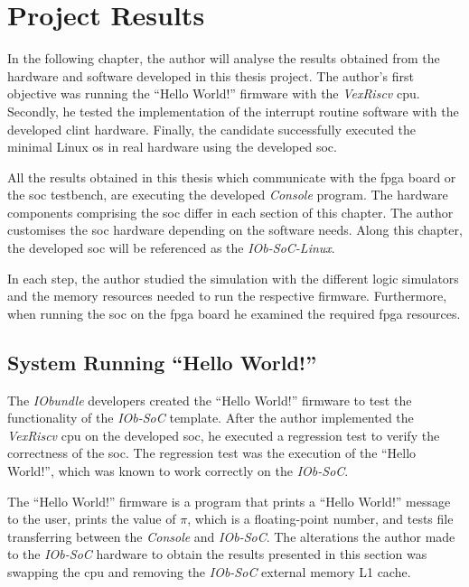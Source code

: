 \chapter{Project Results}
\label{chapter:project_results}
In the following chapter, the author will analyse the results obtained from the hardware and software developed in this thesis project. The author's first objective was running the \enquote{Hello World!} firmware with the \textit{VexRiscv} \acrshort{cpu}. Secondly, he tested the implementation of the interrupt routine software with the developed \acrshort{clint} hardware. Finally, the candidate successfully executed the minimal Linux \acrshort{os} in real hardware using the developed \acrlong{soc}.

All the results obtained in this thesis which communicate with the \acrshort{fpga} board or the \acrshort{soc} testbench, are executing the developed \textit{Console} program. The hardware components comprising the \acrshort{soc} differ in each section of this chapter. The author customises the \acrshort{soc} hardware depending on the software needs. Along this chapter, the developed \acrshort{soc} will be referenced as the \textit{IOb-SoC-Linux}.

In each step, the author studied the simulation with the different logic simulators and the memory resources needed to run the respective firmware. Furthermore, when running the \acrshort{soc} on the \acrshort{fpga} board he examined the required \acrshort{fpga} resources.

\section{System Running \enquote{Hello World!}}
\label{section:hello_world}
The \textit{IObundle} developers created the \enquote{Hello World!} firmware to test the functionality of the \textit{IOb-SoC} template. After the author implemented the \textit{VexRiscv} \acrshort{cpu} on the developed \acrshort{soc}, he executed a regression test to verify the correctness of the \acrshort{soc}. The regression test was the execution of the \enquote{Hello World!}, which was known to work correctly on the \textit{IOb-SoC}.

The \enquote{Hello World!} firmware is a program that prints a \enquote{Hello World!} message to the user, prints the value of $\pi$, which is a floating-point number, and tests file transferring between the \textit{Console} and \textit{IOb-SoC}. The alterations the author made to the \textit{IOb-SoC} hardware to obtain the results presented in this section was swapping the \acrshort{cpu} and removing the \textit{IOb-SoC} external memory L1 cache.

